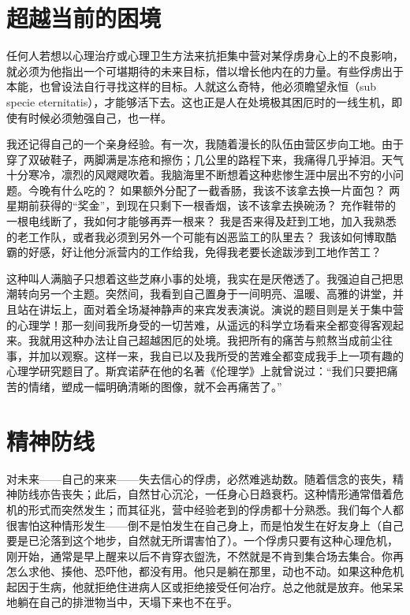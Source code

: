 \documentclass[11pt,oneside]{book}
\begin{document}
\begin{common-format}
\section{超越当前的困境}
任何人若想以心理治疗或心理卫生方法来抗拒集中营对某俘虏身心上的不良影响，就必须为他指出一个可堪期待的未来目标，借以增长他内在的力量。有些俘虏出于本能，也曾设法自行寻找这样的目标。人就这么奇特，他必须瞻望永恒（sub specie eternitatis），才能够活下去。这也正是人在处境极其困厄时的一线生机，即使有时候必须勉强自己，也一样。

我还记得自己的一个亲身经验。有一次，我随着漫长的队伍由营区步向工地。由于穿了双破鞋子，两脚满是冻疮和擦伤；几公里的路程下来，我痛得几乎掉泪。天气十分寒冷，凛烈的风飕飕吹着。我脑海里不断想着这种悲惨生涯中层出不穷的小问题。今晚有什么吃的？ 如果额外分配了一截香肠，我该不该拿去换一片面包？ 两星期前获得的“奖金”，到现在只剩下一根香烟，该不该拿去换碗汤？ 充作鞋带的一根电线断了，我如何才能够再弄一根来？ 我是否来得及赶到工地，加入我熟悉的老工作队，或者我必须到另外一个可能有凶恶监工的队里去？ 我该如何博取酷霸的好感，好让他分派营内的工作给我，免得我老要长途跋涉到工地作苦工？

这种叫人满脑子只想着这些芝麻小事的处境，我实在是厌倦透了。我强迫自己把思潮转向另一个主题。突然间，我看到自己置身于一间明亮、温暖、高雅的讲堂，并且站在讲坛上，面对着全场凝神静声的来宾发表演说。演说的题目则是关于集中营的心理学！那一刻间我所身受的一切苦难，从遥远的科学立场看来全都变得客观起来。我就用这种办法让自己超越困厄的处境。我把所有的痛苦与煎熬当成前尘往事，并加以观察。这样一来，我自已以及我所受的苦难全都变成我手上一项有趣的心理学研究题目了。斯宾诺萨在他的名著《伦理学》上就曾说过：“我们只要把痛苦的情绪，塑成一幅明确清晰的图像，就不会再痛苦了。”

\section{精神防线}
对未来——自己的来来——失去信心的俘虏，必然难逃劫数。随着信念的丧失，精神防线亦告丧失；此后，自然甘心沉沦，一任身心日趋衰朽。这种情形通常借着危机的形式而突然发生；而其征兆，营中经验老到的俘虏都十分熟悉。我们每个人都很害怕这种情形发生——倒不是怕发生在自己身上，而是怕发生在好友身上（自己要是已沦落到这个地步，自然就无所谓害怕了）。一个俘虏只要有这种心理危机，刚开始，通常是早上醒来以后不肯穿衣盥洗，不然就是不肯到集合场去集合。你再怎么求他、揍他、恐吓他，都没有用。他只是躺在那里，动也不动。如果这种危机起因于生病，他就拒绝住进病人区或拒绝接受任何冶疗。总之他就是放弃。他呆呆地躺在自己的排泄物当中，天塌下来也不在乎。


\end{common-format}
\end{document}
